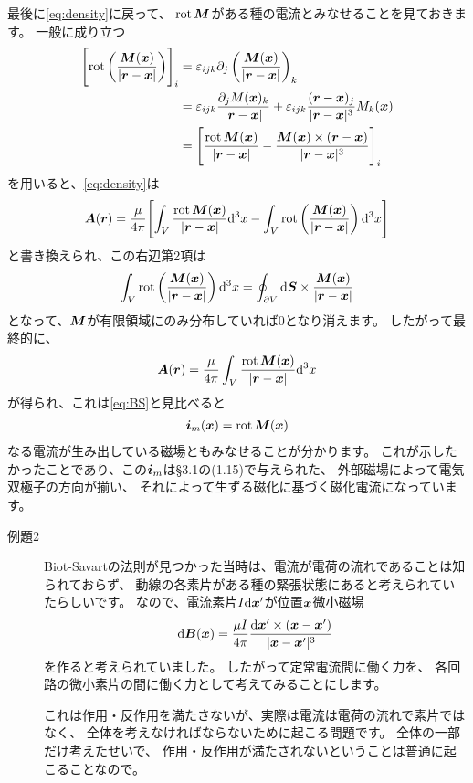 \documentclass[a4paper, 12pt]{jsarticle}
\def\vec#1{\mbox{\boldmath $#1$}}
\newcommand{\ddif}{{\rm d}}
\DeclareMathOperator{\Rot}{rot}
\begin{document}
最後に\eqref{eq:density}に戻って、
$\Rot \vec{M}$がある種の電流とみなせることを見ておきます。
一般に成り立つ
\begin{align}
	\Biggl[ \Rot \left(\frac{\vec{M}(\vec{x})}{|\vec{r} - \vec{x}|}\right)
	\Biggr]_i
	&= \varepsilon_{ijk} \partial_j
	\left( \frac{\vec{M}(\vec{x})}{|\vec{r} - \vec{x}|}\right)_k \\
	&= \varepsilon_{ijk} \frac{\partial_j M(\vec{x})_k}{|\vec{r} - \vec{x}|}
	+ \varepsilon_{ijk} \frac{(\vec{r} - \vec{x})_j}{|\vec{r} - \vec{x}|^3}
	M_k(\vec{x}) \\
	&= \Biggl[ \frac{\Rot \vec{M}(\vec{x})}{|\vec{r} - \vec{x}|} 
	- \frac{\vec{M}(\vec{x}) \times (\vec{r} - \vec{x})}{|\vec{r} - \vec{x}|^3}
	\Biggr]_i
\end{align}
を用いると、\eqref{eq:density}は
\begin{align}
	\vec{A}(\vec{r}) = \frac{\mu}{4\pi} \Biggl[
		\int_V \frac{\Rot \vec{M}(\vec{x})}{|\vec{r} - \vec{x}|} \ddif^3 x
		- \int_V \Rot \left(\frac{\vec{M}(\vec{x})}{|\vec{r} - \vec{x}|}\right)
		\ddif^3 x
	\Biggr]
\end{align}
と書き換えられ、この右辺第2項は
\begin{align}
	\int_V \Rot \left(\frac{\vec{M}(\vec{x})}{|\vec{r} - \vec{x}|}\right)\ddif^3 x
	= \oint_{\partial V} \ddif \vec{S} \times
	\frac{\vec{M}(\vec{x})}{|\vec{r} - \vec{x}|}
\end{align}
となって、$\vec{M}$が有限領域にのみ分布していれば0となり消えます。
したがって最終的に、
\begin{align}
	\vec{A}(\vec{r}) = \frac{\mu}{4\pi}
	\int_V \frac{\Rot \vec{M}(\vec{x})}{|\vec{r} - \vec{x}|} \ddif^3 x
\end{align}
が得られ、これは\eqref{eq:BS}と見比べると
\begin{align}
	\vec{i}_m(\vec{x}) = \Rot \vec{M}(\vec{x})
\end{align}
なる電流が生み出している磁場ともみなせることが分かります。
これが示したかったことであり、この$\vec{i}_m$は\S 3.1の(1.15)で与えられた、
外部磁場によって電気双極子の方向が揃い、
それによって生ずる磁化に基づく磁化電流になっています。

\begin{description}
	\item[例題2]
	Biot-Savartの法則が見つかった当時は、電流が電荷の流れであることは知られておらず、
	動線の各素片がある種の緊張状態にあると考えられていたらしいです。
	なので、電流素片$I \ddif \vec{x}'$が位置$\vec{x}$微小磁場
	\begin{align}
		\ddif \vec{B}(\vec{x}) = \frac{\mu I}{4\pi}
		\frac{\ddif \vec{x}' \times (\vec{x} - \vec{x}')}
		{|\vec{x} - \vec{x}'|^3}
	\end{align}
	を作ると考えられていました。
	したがって定常電流間に働く力を、
	各回路の微小素片の間に働く力として考えてみることにします。

	これは作用・反作用を満たさないが、実際は電流は電荷の流れで素片ではなく、
	全体を考えなければならないために起こる問題です。
	全体の一部だけ考えたせいで、
	作用・反作用が満たされないということは普通に起こることなので。
\end{description}
\end{document}
